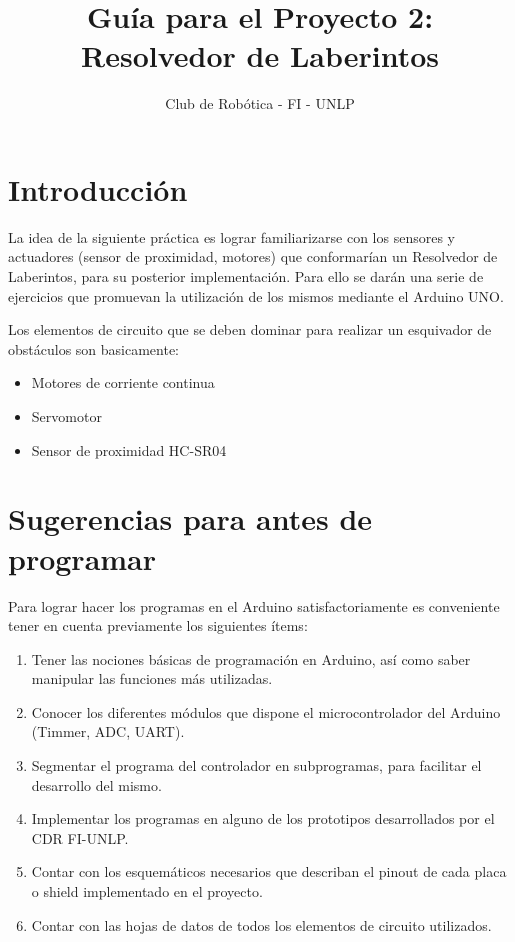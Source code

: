 \documentclass[a4paper,11pt]{article}
\title{\Huge{\textbf{Guía para el Proyecto 2: Resolvedor de Laberintos}}}
\author{Club de Robótica - FI - UNLP}
\date{}
\begin{document}
\maketitle

\section{Introducción}

La idea de la siguiente práctica es lograr familiarizarse con los sensores y actuadores (sensor de proximidad, motores) que conformarían un Resolvedor de Laberintos, para su posterior implementación. Para ello se darán una serie de ejercicios que promuevan la utilización de los mismos mediante el Arduino UNO.

Los elementos de circuito que se deben dominar para realizar un esquivador de obstáculos son basicamente:

\begin{itemize}
	\item Motores de corriente continua 
	\item Servomotor
	\item Sensor de proximidad HC-SR04
\end{itemize}
 


\section{Sugerencias para antes de programar}

Para lograr hacer los programas en el Arduino satisfactoriamente es conveniente tener en cuenta previamente los siguientes ítems:

\begin{enumerate}
	\item Tener las nociones básicas de programación en Arduino, así como saber manipular las funciones más utilizadas.	
	\item Conocer los diferentes módulos que dispone el microcontrolador del Arduino (Timmer, ADC, UART).
	\item Segmentar el programa del controlador en subprogramas, para facilitar el desarrollo del mismo.
	\item Implementar los programas en alguno de los prototipos desarrollados por el CDR FI-UNLP.
	\item Contar con los esquemáticos necesarios que describan el pinout de cada placa o shield implementado en el proyecto.
	\item Contar con las hojas de datos de todos los elementos de circuito utilizados.
\end{enumerate}
 
\end{document}
